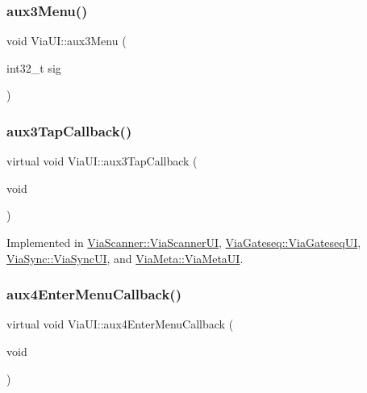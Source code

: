 \mbox{\label{class_via_u_i_adf0e11621a20477354eb1169c3943cb8}} 
\subsubsection{\texorpdfstring{aux3\+Menu()}{aux3Menu()}}
{\footnotesize\ttfamily void Via\+U\+I\+::aux3\+Menu (\begin{DoxyParamCaption}\item[{int32\+\_\+t}]{sig }\end{DoxyParamCaption})}

\mbox{\label{class_via_u_i_a29026efd361a615374adce2462aa652a}} 
\subsubsection{\texorpdfstring{aux3\+Tap\+Callback()}{aux3TapCallback()}}
{\footnotesize\ttfamily virtual void Via\+U\+I\+::aux3\+Tap\+Callback (\begin{DoxyParamCaption}\item[{void}]{ }\end{DoxyParamCaption})\hspace{0.3cm}{\ttfamily [pure virtual]}}



Implemented in \mbox{\hyperlink{class_via_scanner_1_1_via_scanner_u_i_a7d15083a3565f56b4b70ac497fddd563}{Via\+Scanner\+::\+Via\+Scanner\+UI}}, \mbox{\hyperlink{class_via_gateseq_1_1_via_gateseq_u_i_a9bb95780740cd9fe650ba38aa3fb86a6}{Via\+Gateseq\+::\+Via\+Gateseq\+UI}}, \mbox{\hyperlink{class_via_sync_1_1_via_sync_u_i_afe95d77f17525a7e612485089a01ab0d}{Via\+Sync\+::\+Via\+Sync\+UI}}, and \mbox{\hyperlink{class_via_meta_1_1_via_meta_u_i_a4f9a282e24dd484d24657a1568defd75}{Via\+Meta\+::\+Via\+Meta\+UI}}.

\mbox{\label{class_via_u_i_a36cc4bac8f774c2a59ab8635be05f884}} 
\subsubsection{\texorpdfstring{aux4\+Enter\+Menu\+Callback()}{aux4EnterMenuCallback()}}
{\footnotesize\ttfamily virtual void Via\+U\+I\+::aux4\+Enter\+Menu\+Callback (\begin{DoxyParamCaption}\item[{void}]{ }\end{DoxyParamCaption})\hspace{0.3cm}{\ttfamily [pure virtual]}}




